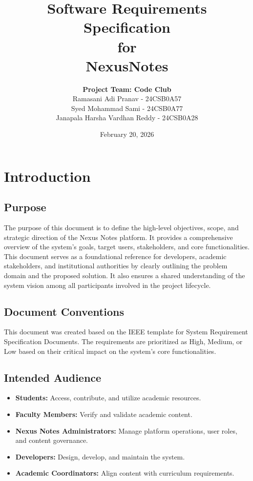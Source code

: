 \documentclass[12pt]{article}
\title{\textbf{Software Requirements Specification} \\ for \\ \textbf{NexusNotes}}
\author{
    \textbf{Project Team: Code Club} \\
    Ramasani Adi Pranav - 24CSB0A57 \\
    Syed Mohammad Sami - 24CSB0A77 \\
    Janapala Harsha Vardhan Reddy - 24CSB0A28
}
\date{February 20, 2026}
\begin{document}
\maketitle
\thispagestyle{empty}
\newpage

\tableofcontents
\newpage

\section{Introduction}

\subsection{Purpose}
The purpose of this document is to define the high-level objectives, scope, and strategic direction of the Nexus Notes platform.
It provides a comprehensive overview of the system's goals, target users, stakeholders, and core functionalities.
This document serves as a foundational reference for developers, academic stakeholders, and institutional authorities by clearly outlining the problem domain and the proposed solution.
It also ensures a shared understanding of the system vision among all participants involved in the project lifecycle.

\subsection{Document Conventions}
This document was created based on the IEEE template for System Requirement Specification Documents.
The requirements are prioritized as High, Medium, or Low based on their critical impact on the system's core functionalities.

\subsection{Intended Audience}

\begin{itemize}
    \item \textbf{Students:} Access, contribute, and utilize academic resources.
    \item \textbf{Faculty Members:} Verify and validate academic content.
    \item \textbf{Nexus Notes Administrators:} Manage platform operations, user roles, and content governance.
    \item \textbf{Developers:} Design, develop, and maintain the system.
    \item \textbf{Academic Coordinators:} Align content with curriculum requirements.
\end{itemize}
\end{document}
